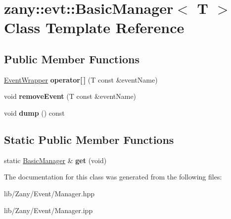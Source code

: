 \hypertarget{classzany_1_1evt_1_1_basic_manager}{}\section{zany\+:\+:evt\+:\+:Basic\+Manager$<$ T $>$ Class Template Reference}
\label{classzany_1_1evt_1_1_basic_manager}
\subsection*{Public Member Functions}
\begin{DoxyCompactItemize}
\item 
\mbox{\label{classzany_1_1evt_1_1_basic_manager_ad84e9c47990936604cdf1f40c68afe9b}} 
\hyperlink{classzany_1_1evt_1_1_event_wrapper}{Event\+Wrapper} {\bfseries operator\mbox{[}$\,$\mbox{]}} (T const \&event\+Name)
\item 
\mbox{\label{classzany_1_1evt_1_1_basic_manager_aa4229588f74fb7996ed6c24d951ab233}} 
void {\bfseries remove\+Event} (T const \&event\+Name)
\item 
\mbox{\label{classzany_1_1evt_1_1_basic_manager_a4329339e15103ef3185292d74fe69992}} 
void {\bfseries dump} () const
\end{DoxyCompactItemize}
\subsection*{Static Public Member Functions}
\begin{DoxyCompactItemize}
\item 
\mbox{\label{classzany_1_1evt_1_1_basic_manager_a6229a6eba6a5df353e01a19d75646a01}} 
static \hyperlink{classzany_1_1evt_1_1_basic_manager}{Basic\+Manager} \& {\bfseries get} (void)
\end{DoxyCompactItemize}


The documentation for this class was generated from the following files\+:\begin{DoxyCompactItemize}
\item 
lib/\+Zany/\+Event/Manager.\+hpp\item 
lib/\+Zany/\+Event/Manager.\+ipp\end{DoxyCompactItemize}
